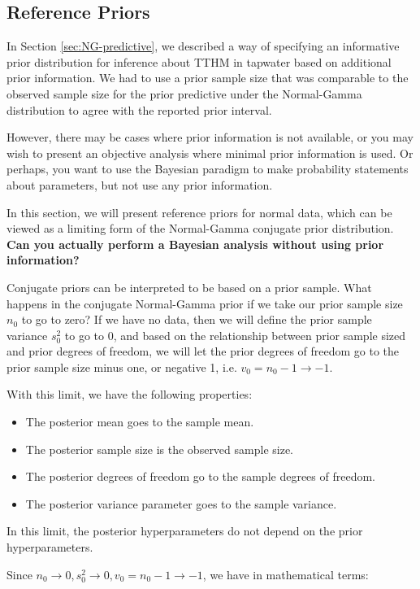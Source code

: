 \documentclass[]{book}
\theoremstyle{definition}
\theoremstyle{definition}
\theoremstyle{definition}
\theoremstyle{remark}
\begin{document}
\subsection{Reference Priors}\label{sec:NG-reference}

In Section \ref{sec:NG-predictive}, we described a way of specifying an
informative prior distribution for inference about TTHM in tapwater
based on additional prior information. We had to use a prior sample size
that was comparable to the observed sample size for the prior predictive
under the Normal-Gamma distribution to agree with the reported prior
interval.

However, there may be cases where prior information is not available, or
you may wish to present an objective analysis where minimal prior
information is used. Or perhaps, you want to use the Bayesian paradigm
to make probability statements about parameters, but not use any prior
information.

In this section, we will present reference priors for normal data, which
can be viewed as a limiting form of the Normal-Gamma conjugate prior
distribution. \textbf{Can you actually perform a Bayesian analysis
without using prior information?}

Conjugate priors can be interpreted to be based on a prior sample. What
happens in the conjugate Normal-Gamma prior if we take our prior sample
size \(n_0\) to go to zero? If we have no data, then we will define the
prior sample variance \(s_0^2\) to go to 0, and based on the
relationship between prior sample sized and prior degrees of freedom, we
will let the prior degrees of freedom go to the prior sample size minus
one, or negative 1, i.e. \(v_0 = n_0 - 1 \rightarrow -1\).

With this limit, we have the following properties:

\begin{itemize}
\item
  The posterior mean goes to the sample mean.
\item
  The posterior sample size is the observed sample size.
\item
  The posterior degrees of freedom go to the sample degrees of freedom.
\item
  The posterior variance parameter goes to the sample variance.
\end{itemize}

In this limit, the posterior hyperparameters do not depend on the prior
hyperparameters.

Since
\(n_0 \rightarrow 0, s^2_0 \rightarrow 0, v_0 = n_0 - 1 \rightarrow -1\),
we have in mathematical terms:
\end{document}
